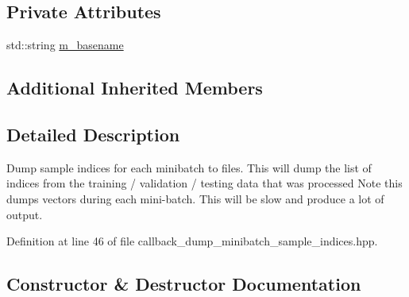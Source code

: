 \subsection*{Private Attributes}
\begin{DoxyCompactItemize}
\item 
std\+::string \hyperlink{classlbann_1_1lbann__callback__dump__minibatch__sample__indices_a75ef9a964cb1e1281e4721beef14c265}{m\+\_\+basename}
\end{DoxyCompactItemize}
\subsection*{Additional Inherited Members}


\subsection{Detailed Description}
Dump sample indices for each minibatch to files. This will dump the list of indices from the training / validation / testing data that was processed Note this dumps vectors during each mini-\/batch. This will be slow and produce a lot of output. 

Definition at line 46 of file callback\+\_\+dump\+\_\+minibatch\+\_\+sample\+\_\+indices.\+hpp.



\subsection{Constructor \& Destructor Documentation}
\mbox{\label{classlbann_1_1lbann__callback__dump__minibatch__sample__indices_a32e575722f9ad6f5a48a3fad20282075}} 
